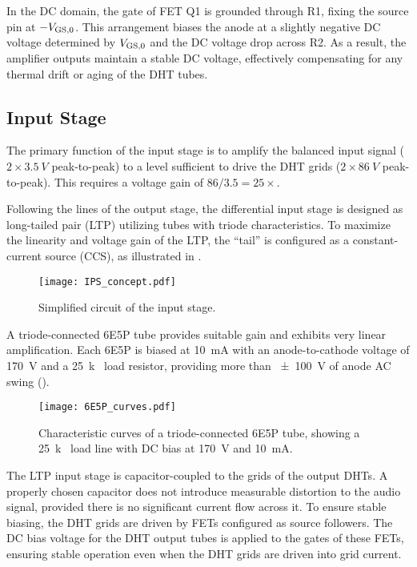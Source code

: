 In the DC domain, the gate of FET Q1 is grounded through R1, fixing the source pin at $-V_{\rm GS,0}$. This arrangement biases the anode at a slightly negative DC voltage determined by $V_{\rm GS,0}$ and the DC voltage drop across R2. As a result, the amplifier outputs maintain a stable DC voltage, effectively compensating for any thermal drift or aging of the DHT tubes.


\subsection{Input Stage}

The primary function of the input stage is to amplify the balanced input signal ($2 \times \SI{3.5}{V}$ peak-to-peak) to a level sufficient to drive the DHT grids ($2 \times \SI{86}{V}$ peak-to-peak). This requires a voltage gain of $86 / 3.5 = 25\times$.

Following the lines of the output stage, the differential input stage is designed as long-tailed pair (LTP)\cite{valvewizard_LTP} utilizing tubes with triode characteristics. To maximize the linearity and voltage gain of the LTP, the ``tail'' is configured as a constant-current source (CCS), as illustrated in .

\begin{figure}
\begin{center}
\texttt{[image: IPS\_concept.pdf]}
\caption{Simplified circuit of the input stage.}
\end{center}
\end{figure}

A triode-connected 6E5P tube provides suitable gain and exhibits very linear amplification\cite{bartola_thdbenchmark,osdeha_p33}. Each 6E5P is biased at \SI{10}{mA} with an anode-to-cathode voltage of \SI{170}{V} and a \SI{25}{k\Ohm} load resistor, providing more than \SI{\pm100}{V} of anode AC swing ().

\begin{figure}
\begin{center}
\texttt{[image: 6E5P\_curves.pdf]}
\caption{Characteristic curves of a triode-connected 6E5P tube, showing a \SI{25}{k\Ohm} load line with DC bias at \SI{170}{V} and \SI{10}{mA}.}
\end{center}
\end{figure}

The LTP input stage is capacitor-coupled to the grids of the output DHTs. A properly chosen capacitor does not introduce measurable distortion to the audio signal\cite{bateman_caps_distortion}, provided there is no significant current flow across it\cite{aiken_farting_out}. To ensure stable biasing, the DHT grids are driven by FETs configured as source followers. The DC bias voltage for the DHT output tubes is applied to the gates of these FETs, ensuring stable operation even when the DHT grids are driven into grid current.


